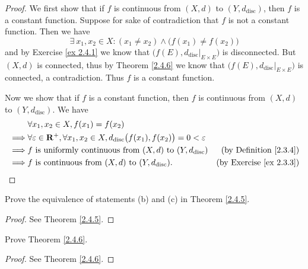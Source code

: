 \begin{proof}
    We first show that if \(f\) is continuous from \((X, d)\) to \((Y, d_{\text{disc}})\), then \(f\) is a constant function.
    Suppose for sake of contradiction that \(f\) is not a constant function.
    Then we have
    \[
        \exists\ x_1, x_2 \in X : (x_1 \neq x_2) \land \big(f(x_1) \neq f(x_2)\big)
    \]
    and by Exercise \ref{ex 2.4.1} we know that \(\big(f(E), d_{\text{disc}}|_{E \times E}\big)\) is disconnected.
    But \((X, d)\) is connected, thus by Theorem \ref{2.4.6} we know that \(\big(f(E), d_{\text{disc}}|_{E \times E}\big)\) is connected, a contradiction.
    Thus \(f\) is a constant function.

    Now we show that if \(f\) is a constant function, then \(f\) is continuous from \((X, d)\) to \((Y, d_{\text{disc}})\).
    We have
    \begin{align*}
                 & \forall x_1, x_2 \in X, f(x_1) = f(x_2)                                                                                                               \\
        \implies & \forall \varepsilon \in \mathbf{R}^+, \forall x_1, x_2 \in X, d_{\text{disc}}\big(f(x_1), f(x_2)\big) = 0 < \varepsilon                                       \\
        \implies & f \text{ is uniformly continuous from } (X, d) \text{ to } (Y, d_{\text{disc}})                                 & \text{(by Definition \ref{2.3.4})}  \\
        \implies & f \text{ is continuous from } (X, d) \text{ to } (Y, d_{\text{disc}}).                                          & \text{(by Exercise \ref{ex 2.3.3})}
    \end{align*}
\end{proof}

\begin{exercise}\label{ex 2.4.3}
    Prove the equivalence of statements (b) and (c) in Theorem \ref{2.4.5}.
\end{exercise}

\begin{proof}
    See Theorem \ref{2.4.5}.
\end{proof}

\begin{exercise}\label{ex 2.4.4}
    Prove Theorem \ref{2.4.6}.
\end{exercise}

\begin{proof}
    See Theorem \ref{2.4.6}.
\end{proof}

